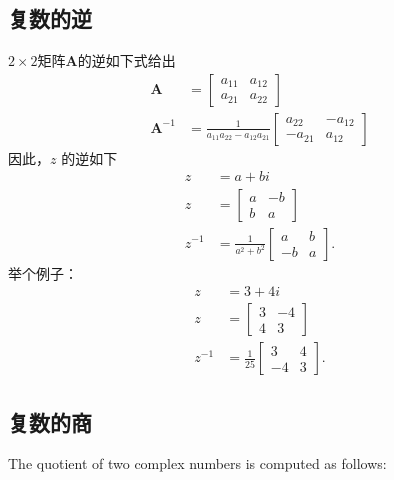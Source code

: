 \subsection{复数的逆}
$2 \times 2$矩阵$\mathbf{A}$的逆如下式给出
$$
\begin{aligned}
\mathbf{A} & =\left[\begin{array}{ll}
a_{11} & a_{12} \\
a_{21} & a_{22}
\end{array}\right] \\
\mathbf{A}^{-1} & =\frac{1}{a_{11} a_{22}-a_{12} a_{21}}\left[\begin{array}{cc}
a_{22} & -a_{12} \\
-a_{21} & a_{12}
\end{array}\right]
\end{aligned}
$$
因此，$z$ 的逆如下
$$
\begin{aligned}
z & =a+b i \\
z & =\left[\begin{array}{cc}
a & -b \\
b & a
\end{array}\right] \\
z^{-1} & =\frac{1}{a^{2}+b^{2}}\left[\begin{array}{cc}
a & b \\
-b & a
\end{array}\right] .
\end{aligned}
$$
举个例子：
$$
\begin{aligned}
z & =3+4 i \\
z & =\left[\begin{array}{cc}
3 & -4 \\
4 & 3
\end{array}\right] \\
z^{-1} & =\frac{1}{25}\left[\begin{array}{cc}
3 & 4 \\
-4 & 3
\end{array}\right] .
\end{aligned}
$$

\subsection{复数的商}
The quotient of two complex numbers is computed as follows:

